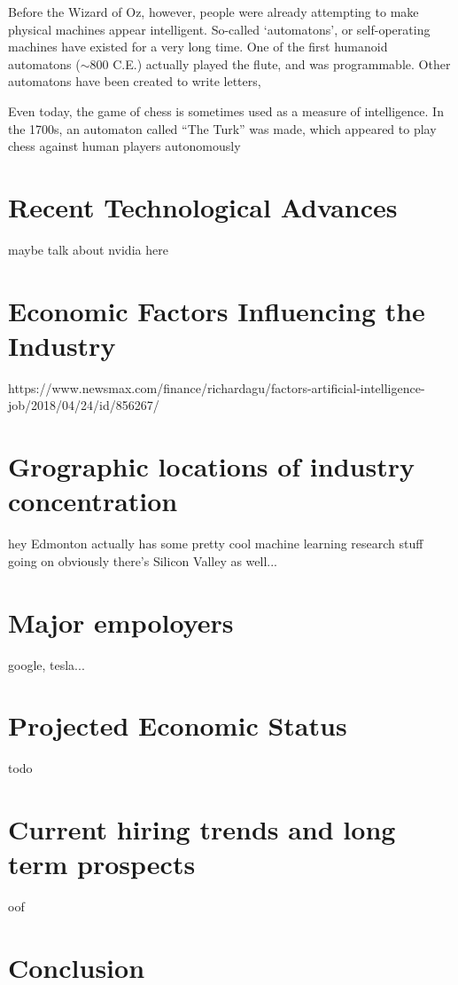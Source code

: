 \documentclass[letterpaper,12pt]{article}
\begin{document}
Before the Wizard of Oz, however, people were already attempting to make physical machines
appear intelligent. So-called `automatons', or self-operating machines have existed for
a very long time. One of the first humanoid automatons ($\sim$800 C.E.) actually played the flute, and was programmable.\cite{automaton}
Other automatons have been created to write letters, 

Even today, the game of chess is sometimes used as a measure of intelligence.
In the 1700s, an automaton called ``The Turk'' was made, which appeared to play chess
against human players autonomously\cite{turk}



\section{Recent Technological Advances}
maybe talk about nvidia here

\section{Economic Factors Influencing the Industry}
https://www.newsmax.com/finance/richardagu/factors-artificial-intelligence-job/2018/04/24/id/856267/

\section{Grographic locations of industry concentration}
hey Edmonton actually has some pretty cool machine learning research stuff
going on
obviously there's Silicon Valley as well...

\section{Major empoloyers}
google, tesla...

\section{Projected Economic Status}
todo \cite{forbesprojected}

\section{Current hiring trends and long term prospects}
oof
\section{Conclusion}
\lipsum[1]


\singlespacing
\nocite{*}
\printbibliography
% 
% 
\end{document}
